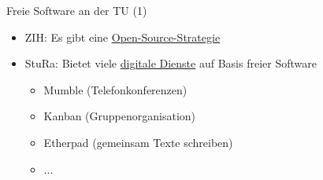 \documentclass[t]{beamer}
\begin{document}
\begin{frame}[label=ct4]{\color{fg}Freie Software an der TU (1) }

\begin{itemize}
 \item ZIH: Es gibt eine \href{https://tu-dresden.de/zih/dienste/software-auswahl-und-open-source-strategie}{Open-Source-Strategie}
 \item StuRa: Bietet viele \href{https://wiki.stura.tu-dresden.de/doku.php?id=allgemein:dienste:start}{digitale Dienste} auf Basis freier Software
\begin{itemize}
 \item Mumble (Telefonkonferenzen)
 \item Kanban (Gruppenorganisation)
 \item Etherpad (gemeinsam Texte schreiben)
 \item ...

\end{itemize}

\end{itemize}

\end{frame}

\end{document}
